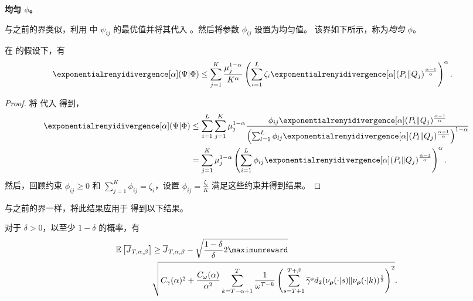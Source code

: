 \textbf{均匀 $\phi$。}

与之前的界类似，利用  中 $\psi_{ij}$ 的最优值并将其代入 。然后将参数 $\phi_{ij}$ 设置为均匀值。
该界如下所示，称为\textit{均匀 $\phi$}。

\begin{prop}
在  的假设下，有
    \begin{align*}
        \exponentialrenyidivergence[\alpha](\Psi\vert\Phi)
        &\leq \sum_{j=1}^K \frac{\mu_j^{1-\alpha}}{K^{\alpha}}  \left(\sum_{i=1}^L \zeta_i \exponentialrenyidivergence[\alpha](P_i \Vert Q_j)^{\frac{\alpha-1}{\alpha}}
        \right)^{\alpha}.
    \end{align*}
\end{prop}
\begin{proof}
    将  代入  得到，
    \begin{align*}
        \exponentialrenyidivergence[\alpha](\Psi\vert\Phi)
        &\leq \sum_{i=1}^L\sum_{j=1}^K \mu_j^{1-\alpha} \frac{\phi_{ij}\exponentialrenyidivergence[\alpha](P_i \Vert Q_j)^{\frac{\alpha-1}{\alpha}}}{\left(\sum_{l=1}^L \phi_{lj}\exponentialrenyidivergence[\alpha](P_l \Vert Q_j)^{\frac{\alpha-1}{\alpha}}\right)^{1-\alpha}}
        \\
        &= \sum_{j=1}^K \mu_j^{1-\alpha} \left(\sum_{i=1}^L \phi_{ij}\exponentialrenyidivergence[\alpha](P_i \Vert Q_j)^{\frac{\alpha-1}{\alpha}}
        \right)^{\alpha}.
    \end{align*}
    然后，回顾约束 $\phi_{ij}\geq 0$ 和 $\textstyle\sum_{j=1}^K \phi_{ij}=\zeta_i$，设置 $\textstyle\phi_{ij}=\frac{\zeta_i}{K}$ 满足这些约束并得到结果。
\end{proof}

与之前的界一样，将此结果应用于  得到以下结果。

\begin{prop}
    对于 $\delta>0$，以至少 $1-\delta$ 的概率，有
    \begin{align*}
        \mathbb{E}\left[\overline{J}_{T,\alpha,\beta} \right]
        &\geq  \overline{J}_{T,\alpha,\beta} -
        \sqrt{
            \frac{1-\delta}{\delta} 2 \maximumreward  }
        \\
        &\sqrt{
            C_\gamma(\alpha)^2 +
            \frac{C_\omega(\alpha)}{\alpha^2}
            \sum_{k=T-\alpha+1}^T \frac{1}{\omega^{T-k}} \left(\sum_{s=T+1}^{T+\beta}\widehat{\gamma}^s d_2(\nu_{\boldsymbol\rho}(\cdot\vert s)\Vert \nu_{\boldsymbol\rho}(\cdot\vert k))^{\frac{1}{2}}
            \right)^{2}
        }.
    \end{align*}
\end{prop}




